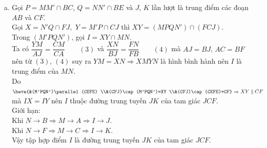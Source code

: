 \begin{ex}
{\begin{enumerate}[a)]
			Tương tự  $NN'\parallel AB\Rightarrow \dfrac{BN}{BF}=\dfrac{AN'}{AF} (2)$.\\
			Từ $(1)$ và  $(2)$ suy ra $\dfrac{AM'}{AD}=\dfrac{AN'}{AF}$.\\
			$\Rightarrow M'N'\parallel DF\subset  (DEF)\Rightarrow M'N'\parallel (DEF)$.\\
			Lại có $MM'\parallel CD\parallel EF\Rightarrow MM'\parallel (DEF)\Rightarrow (DEF)\parallel (MNN'M')$. 
			\item Gọi $P=MM'\cap BC$, $Q=NN'\cap BE$ và $J$, $K$ lần lượt là trung điểm các đoạn $AB$ và  $CF$.\\
			Gọi $X=N'Q\cap FJ$$, $ $Y=M'P\cap  CJ$ thì $XY=(MPQN')\cap (FCJ)$.\\
			Trong $(M'PQN')$, gọi  $I=XY\cap MN$.\\
			Ta có $\dfrac{YM}{AJ}=\dfrac{CM}{CA}\qquad (3)$ và $\dfrac{XN}{BJ}=\dfrac{FN}{FB} \qquad(4)$ mà $AJ=BJ$, $AC=BF$ nên từ $(3)$, $(4)$ suy ra $YM=XN\Rightarrow XMYN$ là hình bình hành nên  $I$ là trung điểm của $MN$.\\
			Do $\heva{&(M'PQN')\parallel (CEFE) \\&(CFJ)\cap (M'PQN')=XY \\&(CFJ)\cap (CEFE)=CF}\Rightarrow XY\parallel CF$ mà $IX=IY$ nên $I$ thuộc đường trung tuyến $JK$  của tam giác $JCF$.\\
			Giới hạn:\\ 
			Khi  $N\to B\Rightarrow M\to A\Rightarrow I\to J$.\\
			Khi  $N\to F\Rightarrow M\to C\Rightarrow I\to K$.\\
			Vậy  tập hợp điểm $I$ là đường trung tuyến $JK$ của tam giác $JCF$.
		\end{enumerate}
	 }
\end{ex}

